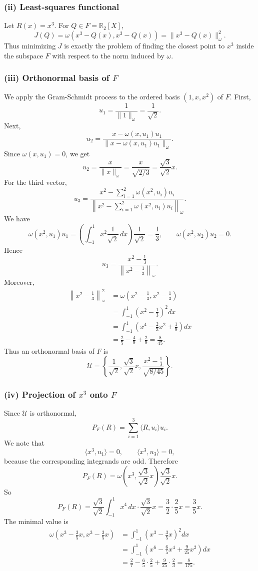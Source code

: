 \documentclass[11pt,a4paper]{article}
\newcommand{\R}{\mathbb{R}}
\begin{document}
\subsubsection*{(ii) Least-squares functional}
Let $R(x)=x^3$. For $Q\in F=\R_2[X]$,
\[
J(Q)=\omega(x^3-Q(x),x^3-Q(x))=\|x^3-Q(x)\|_\omega^2.
\]
Thus minimizing $J$ is exactly the problem of finding the closest point to $x^3$ inside the subspace $F$ with respect to the norm induced by $\omega$.

\subsubsection*{(iii) Orthonormal basis of $F$}
We apply the Gram-Schmidt process to the ordered basis $(1,x,x^2)$ of $F$.
First,
\[
u_1=\frac{1}{\|1\|_\omega}=\frac{1}{\sqrt2}.
\]
Next,
\[
u_2=\frac{x-\omega(x,u_1)u_1}{\|x-\omega(x,u_1)u_1\|_\omega}.
\]
Since $\omega(x,u_1)=0$, we get
\[
u_2=\frac{x}{\|x\|_\omega}=\frac{x}{\sqrt{2/3}}=\frac{\sqrt3}{\sqrt2}x.
\]
For the third vector,
\[
u_3=\frac{x^2-\sum_{i=1}^{2}\omega(x^2,u_i)u_i}{\left\|x^2-\sum_{i=1}^{2}\omega(x^2,u_i)u_i\right\|_\omega}.
\]
We have
\[
\omega(x^2,u_1)u_1=\left(\int_{-1}^{1}x^2\frac{1}{\sqrt2}\,dx\right)\frac{1}{\sqrt2}=\frac13,
\qquad
\omega(x^2,u_2)u_2=0.
\]
Hence
\[
u_3=\frac{x^2-\frac13}{\left\|x^2-\frac13\right\|_\omega}.
\]
Moreover,
\begin{align*}
\left\|x^2-\frac13\right\|_\omega^2
&=\omega\left(x^2-\frac13,x^2-\frac13\right)\\
&=\int_{-1}^{1}\left(x^2-\frac13\right)^2dx\\
&=\int_{-1}^{1}\left(x^4-\frac23x^2+\frac19\right)dx\\
&=\frac25-\frac49+\frac29=\frac{8}{45}.
\end{align*}
Thus an orthonormal basis of $F$ is
\[
\mathcal U=\left\{\frac1{\sqrt2},\frac{\sqrt3}{\sqrt2}x,
\frac{x^2-\frac13}{\sqrt{8/45}}\right\}.
\]

\subsubsection*{(iv) Projection of $x^3$ onto $F$}
Since $\mathcal U$ is orthonormal,
\[
P_F(R)=\sum_{i=1}^{3}\langle R,u_i\rangle u_i.
\]
We note that
\[
\langle x^3,u_1\rangle=0,\qquad \langle x^3,u_3\rangle=0,
\]
because the corresponding integrands are odd. Therefore
\[
P_F(R)=\omega\left(x^3,\frac{\sqrt3}{\sqrt2}x\right)\frac{\sqrt3}{\sqrt2}x.
\]
So
\[
P_F(R)=\frac{\sqrt3}{\sqrt2}\int_{-1}^{1}x^4\,dx\cdot\frac{\sqrt3}{\sqrt2}x
=\frac32\cdot\frac25x=\frac35x.
\]
The minimal value is
\begin{align*}
\omega\left(x^3-\frac35x,x^3-\frac35x\right)
&=\int_{-1}^{1}\left(x^3-\frac35x\right)^2dx\\
&=\int_{-1}^{1}\left(x^6-\frac65x^4+\frac9{25}x^2\right)dx\\
&=\frac27-\frac65\cdot\frac25+\frac9{25}\cdot\frac23
=\frac{8}{175}.
\end{align*}
\end{document}
